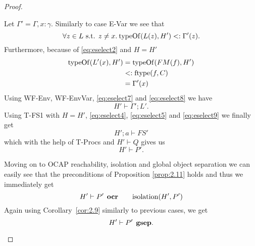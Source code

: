 \begin{proof}
\begin{description}
\begin{description}
\begin{description}
\begin{equation}
              \end{equation}
              Let $\Gamma' = \Gamma, x: \gamma$. Similarly to case {\sc E-Var}
              we see that
              \begin{equation} \label{eq:eselect7}
                \forall z \in L \text{ s.t. } z \neq x . \: \mbox{$\mathrm{typeOf}$}(L(z), H')
                <: \Gamma'(z).
              \end{equation}
              Furthermore, because of \eqref{eq:eselect2} and $H = H'$
              \begin{equation} \label{eq:eselect8}
                \begin{aligned}
                  \mbox{$\mathrm{typeOf}$}(L'(x), H') &= \mbox{$\mathrm{typeOf}$}(FM(f), H') \\
                                     &<: \mbox{$\mathrm{ftype}$}(f, C) \\
                                     &= \Gamma'(x)
                \end{aligned}
              \end{equation}
              Using {\sc WF-Env, WF-EnvVar}, \eqref{eq:eselect7} and
              \eqref{eq:eselect8} we have
              \begin{equation} \label{eq:eselect9}
                H' \vdash \Gamma';L'.
              \end{equation}
              Using {\sc T-FS1} with $H = H'$, \eqref{eq:eselect4}, \eqref{eq:eselect5}
              and \eqref{eq:eselect9} we finally get
              \begin{equation}
                H';a \vdash FS'
              \end{equation}
              which with the help of {\sc T-Procs} and $H' \vdash Q$ gives us 
              \begin{equation*}
                H'\vdash P'.
              \end{equation*}
              
              Moving on to OCAP reachability, isolation and global object
              separation we can easily see that the preconditions of Proposition
              \ref{prop:2.11} holds and thus we immediately get
              \begin{equation*}
                H' \vdash P' \:\: \mbox{\bf ocr} \quad\quad \mbox{$\mathrm{isolation}$}(H', P')
              \end{equation*}
              Again using Corollary~\ref{cor:2.9} similarly to previous cases, we get
              \begin{equation*}
                H' \vdash P' \:\: \mbox{\bf gsep}.
              \end{equation*}



\end{description}
\end{description}
\end{description}
\end{proof}
